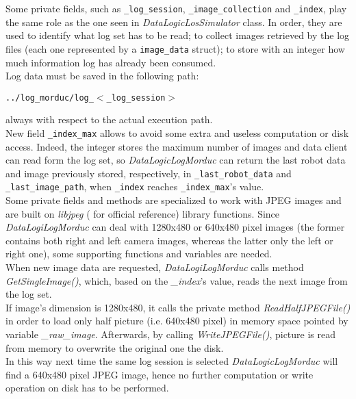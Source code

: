 Some private fields, such as
\texttt{\_log\_session}, \texttt{\_image\_collection}
and \texttt{\_index}, play
the same role as the one seen in \textit{DataLogicLosSimulator}
class. In order, they are used to identify what log set has
to be read; to collect images retrieved by the log files (each
one represented by a \texttt{image\_data} struct);
to store with an integer how much information log has already
been consumed.
\\
Log data must be saved in the following path:

\begin{center}
  \texttt{../log\_morduc/log\_$<$\_log\_session$>$}
\end{center}

always with respect to the actual execution path.
\\
New field \texttt{\_index\_max} allows to avoid some extra and
useless computation or disk access. Indeed, the integer stores
the maximum number
of images and data client can read form the log set, so
\textit{DataLogicLogMorduc}  can
return the last robot data and image previously stored, respectively,
in \texttt{\_last\_robot\_data} and \texttt{\_last\_image\_path},
when \texttt{\_index}
reaches \texttt{\_index\_max}'s value.
\\
Some private fields and methods are specialized to work with JPEG
images and are built on \textit{libjpeg} (\cite{library:libjpeg}
for official reference) library functions.
Since \textit{DataLogiLogMorduc} can deal with 1280x480
or 640x480 pixel images (the former contains both right and left
camera images, whereas the latter only the left or right one),
some supporting functions and variables are needed.
\\
When new image data are requested, \textit{DataLogiLogMorduc}
calls method \textit{GetSingleImage()}, which, based on the
\textit{\_index}'s value, reads the next image from the log set.
\\
If image's dimension is 1280x480, it calls the private method
\textit{ReadHalfJPEGFile()} in order to load only half 
picture (i.e. 640x480 pixel) in memory space pointed by variable
\textit{\_raw\_image}. Afterwards, by calling \textit{WriteJPEGFile()},
picture is read from memory to overwrite the original one the disk.
\\
In this way next time the same log session is selected \textit{DataLogicLogMorduc}
will find a 640x480 pixel JPEG image, hence no further computation
or write operation on disk has to be performed.
\\
